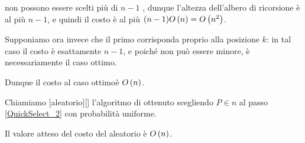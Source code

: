 non possono essere scelti pi\`u di $n - 1$ , dunque
l'altezza dell'albero di ricorsione \`e al pi\`u $n - 1$, e quindi il costo
\`e al pi\`u $(n - 1) O \left ( n \right ) = O \left ( n^2 \right )$.
\par Supponiamo ora invece che il primo  corrisponda proprio
alla posizione $k$: in tal caso il costo \`e esattamente $n - 1$, e poich\'e non
pu\`o essere minore, \`e necessariamente il caso ottimo.
\par Dunque il costo al caso ottimo\`e $O \left ( n \right )$. \EndProof
\begin{Definition}
  Chiamiamo
  [aleatorio][]
  l'algoritmo di  ottenuto scegliendo $P \in n$
  al passo \ref{QuickSelect_2} con probabilit\`a uniforme.
\end{Definition}
\begin{Theorem}
  Il valore atteso del costo del  aleatorio \`e
  $O \left ( n \right )$.
\end{Theorem}
